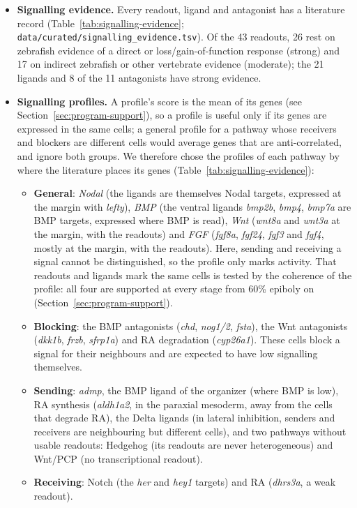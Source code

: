 \documentclass[11pt,a4paper]{article}
\begin{document}
\begin{itemize}
	\item \textbf{Signalling evidence.} Every readout, ligand and antagonist has a literature record (Table~\ref{tab:signalling-evidence}; \nolinkurl{data/curated/signalling_evidence.tsv}). Of the 43 readouts, 26 rest on zebrafish evidence of a direct or loss/gain-of-function response (strong) and 17 on indirect zebrafish or other vertebrate evidence (moderate); the 21 ligands and 8 of the 11 antagonists have strong evidence.
	\item \textbf{Signalling profiles.} A profile's score is the mean of its genes (see Section~\ref{sec:program-support}), so a profile is useful only if its genes are expressed in the same cells; a general profile for a pathway whose receivers and blockers are different cells would average genes that are anti-correlated, and ignore both groups. We therefore chose the profiles of each pathway by where the literature places its genes (Table~\ref{tab:signalling-evidence}):
	\begin{itemize}
		\item \textbf{General}: \emph{Nodal} (the ligands are themselves Nodal targets, expressed at the margin with \emph{lefty}), \emph{BMP} (the ventral ligands \emph{bmp2b}, \emph{bmp4}, \emph{bmp7a} are BMP targets, expressed where BMP is read), \emph{Wnt} (\emph{wnt8a} and \emph{wnt3a} at the margin, with the readouts) and \emph{FGF} (\emph{fgf8a}, \emph{fgf24}, \emph{fgf3} and \emph{fgf4}, mostly at the margin, with the readouts). Here, sending and receiving a signal cannot be distinguished, so the profile only marks activity. That readouts and ligands mark the same cells is tested by the coherence of the profile: all four are supported at every stage from 60\% epiboly on (Section~\ref{sec:program-support}).
		\item \textbf{Blocking}: the BMP antagonists (\emph{chd}, \emph{nog1/2}, \emph{fsta}), the Wnt antagonists (\emph{dkk1b}, \emph{frzb}, \emph{sfrp1a}) and RA degradation (\emph{cyp26a1}). These cells block a signal for their neighbours and are expected to have low signalling themselves.
		\item \textbf{Sending}: \emph{admp}, the BMP ligand of the organizer (where BMP is low), RA synthesis (\emph{aldh1a2}, in the paraxial mesoderm, away from the cells that degrade RA), the Delta ligands (in lateral inhibition, senders and receivers are neighbouring but different cells), and two pathways without usable readouts: Hedgehog (its readouts are never heterogeneous) and Wnt/PCP (no transcriptional readout).
	\item \textbf{Receiving}: Notch (the \emph{her} and \emph{hey1} targets) and RA (\emph{dhrs3a}, a weak readout).

\end{itemize}
\end{itemize}
\end{document}
